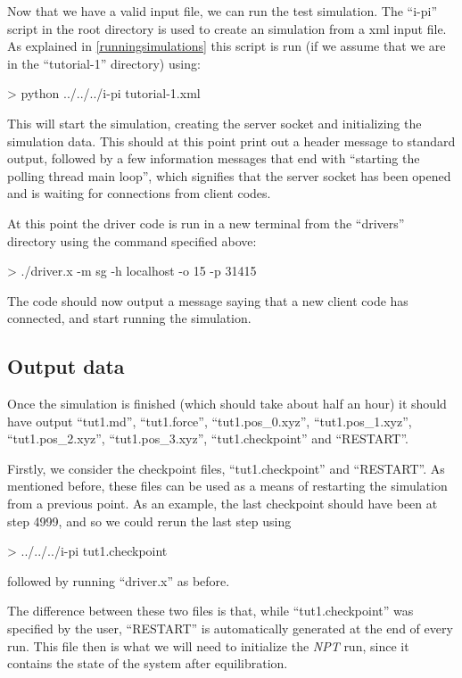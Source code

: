 \documentclass[11pt,english,fleqn]{report}
\newenvironment{code}{%
\footnotesize 
\verbatim
}{
\endverbatim
\normalsize
}
\begin{document}
\label{run1}

Now that we have a valid input file, we can run the test simulation.
The {}``i-pi'' script in the root directory is used to create an
\ipi simulation from a xml input file. As explained in
\ref{runningsimulations} this script is run 
(if we assume that we are in the {}``tutorial-1'' directory) using:

\begin{code}
> python ../../../i-pi tutorial-1.xml
\end{code}

This will start the \ipi simulation, creating the server socket and
initializing the simulation data. This should at this point print
out a header message to standard output, followed by a few information
messages that end with {}``starting the polling thread main loop'',
which signifies that the server socket has been opened and is waiting
for connections from client codes.

At this point the driver code is run in a new terminal 
from the {}``drivers'' directory using the command
specified above:

\begin{code}
> ./driver.x -m sg -h localhost -o 15 -p 31415
\end{code}

The \ipi code should now output a message saying that a new client
code has connected, and start running the simulation.

\subsection{Output data}

Once the simulation is finished (which should take about half an hour)
it should have output {}``tut1.md'', {}``tut1.force'', {}``tut1.pos\_0.xyz'',
{}``tut1.pos\_1.xyz'', {}``tut1.pos\_2.xyz'', {}``tut1.pos\_3.xyz'',
{}``tut1.checkpoint'' and {}``RESTART''.

Firstly, we consider the checkpoint files, 
{}``tut1.checkpoint'' and {}``RESTART''.
As mentioned before, these files can be used as a means of restarting
the simulation from a previous point. As an example, the last
checkpoint should have been at step 4999, and so we could rerun
the last step using
\begin{code}
> ../../../i-pi tut1.checkpoint
\end{code}
followed by running {}``driver.x'' as before.

The difference between these two files is that, while {}``tut1.checkpoint''
was specified by the user, {}``RESTART'' is automatically generated at the
end of every \ipi run. This file then is what we will need to initialize the
\emph{NPT} run, since it contains the state of the system after
equilibration.
\end{document}
